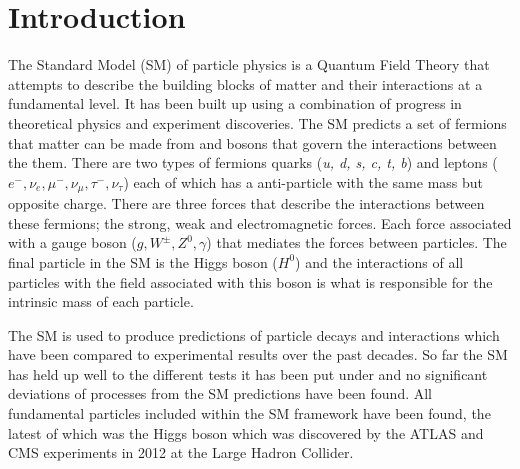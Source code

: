 \chapter{Introduction}

The Standard Model (SM) of particle physics is a Quantum Field Theory that attempts to describe the building blocks of matter and their interactions at a fundamental level. It has been built up using a combination of progress in theoretical physics and experiment discoveries. 
The SM predicts a set of fermions that matter can be made from and bosons that govern the interactions between the them. There are two types of fermions quarks ({\it u, d, s, c, t, b}) and leptons ($e^-, \nu_e, \mu^{-}, \nu_\mu, \tau^{-}, \nu_\tau$) each of which has a anti-particle with the same mass but opposite charge. There are three forces that describe the interactions between these fermions; the strong, weak and electromagnetic forces. Each force associated with a gauge boson ($g, W^\pm, Z^0, \gamma$) that mediates the forces between particles. The final particle in the SM is the Higgs boson ($H^0$) and the interactions of all particles with the field associated with this boson is what is responsible for the intrinsic mass of each particle.

The SM is used to produce predictions of particle decays and interactions which have been compared to experimental results over the past decades. So far the SM has held up well to the different tests it has been put under and no significant deviations of processes from the SM predictions have been found. All fundamental particles included within the SM framework have been found, the latest of which was the Higgs boson which was discovered by the ATLAS and CMS experiments in 2012 at the Large Hadron Collider. 

